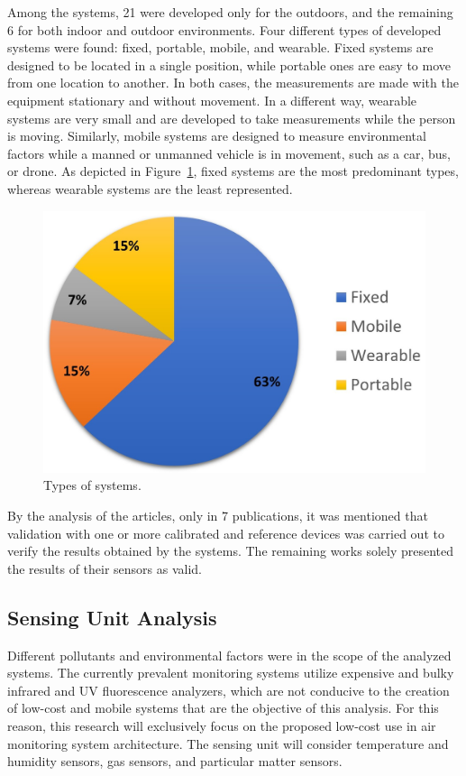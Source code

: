 \documentclass[10pt]{../style_src/imeko_acta}
\begin{document}
Among the systems, 21 were developed only for the outdoors, and the remaining 6 for both indoor and outdoor environments. Four different types of developed systems were found: fixed, portable, mobile, and wearable. Fixed systems are designed to be located in a single position, while portable ones are easy to move from one location to another. In both cases, the measurements are made with the equipment stationary and without movement. In a different way, wearable systems are very small and are developed to take measurements while the person is moving. Similarly, mobile systems are designed to measure environmental factors while a manned or unmanned vehicle is in movement, such as a car, bus, or drone. 
 As depicted in Figure~\ref{type_systems}, fixed systems are the most predominant types, whereas wearable systems are the least represented.

 \begin{figure}[!tb]
	\centering
	\includegraphics[width=0.7\linewidth]{type_of_system.jpg}
	\caption{Types of systems.
        \label{type_systems}}
\end{figure}

By the analysis of the articles, only in 7 publications, it was mentioned that validation with one or more calibrated and reference devices was carried out to verify the results obtained by the systems. The remaining works solely  presented the results of their sensors as valid.

\subsection{Sensing Unit Analysis}\label{SUA}

Different pollutants and environmental factors were in the scope of the analyzed systems. The currently prevalent monitoring systems utilize expensive and bulky infrared and UV fluorescence analyzers, which are not conducive to the creation of low-cost and mobile systems that are the objective of this analysis. For this reason, this research will exclusively focus on the proposed low-cost use in air monitoring system architecture. The sensing unit will consider temperature and humidity sensors, gas sensors, and particular matter sensors. 
\end{document}
